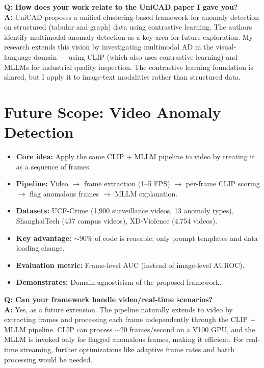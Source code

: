 \documentclass[12pt, a4paper]{article}
\begin{document}
\begin{vivaqa}
\textbf{Q: How does your work relate to the UniCAD paper I gave you?}\\[4pt]
\textbf{A:} UniCAD proposes a unified clustering-based framework for anomaly detection on structured (tabular and graph) data using contrastive learning. The authors identify multimodal anomaly detection as a key area for future exploration. My research extends this vision by investigating multimodal AD in the visual-language domain --- using CLIP (which also uses contrastive learning) and MLLMs for industrial quality inspection. The contrastive learning foundation is shared, but I apply it to image-text modalities rather than structured data.
\end{vivaqa}

\section{Future Scope: Video Anomaly Detection}

\begin{itemize}[leftmargin=*]
    \item \textbf{Core idea:} Apply the same CLIP + MLLM pipeline to video by treating it as a sequence of frames.
    \item \textbf{Pipeline:} Video $\rightarrow$ frame extraction (1--5 FPS) $\rightarrow$ per-frame CLIP scoring $\rightarrow$ flag anomalous frames $\rightarrow$ MLLM explanation.
    \item \textbf{Datasets:} UCF-Crime (1,900 surveillance videos, 13 anomaly types), ShanghaiTech (437 campus videos), XD-Violence (4,754 videos).
    \item \textbf{Key advantage:} $\sim$90\% of code is reusable; only prompt templates and data loading change.
    \item \textbf{Evaluation metric:} Frame-level AUC (instead of image-level AUROC).
    \item \textbf{Demonstrates:} Domain-agnosticism of the proposed framework.
\end{itemize}

\begin{vivaqa}
\textbf{Q: Can your framework handle video/real-time scenarios?}\\[4pt]
\textbf{A:} Yes, as a future extension. The pipeline naturally extends to video by extracting frames and processing each frame independently through the CLIP + MLLM pipeline. CLIP can process $\sim$20 frames/second on a V100 GPU, and the MLLM is invoked only for flagged anomalous frames, making it efficient. For real-time streaming, further optimizations like adaptive frame rates and batch processing would be needed.
\end{vivaqa}
\end{document}
